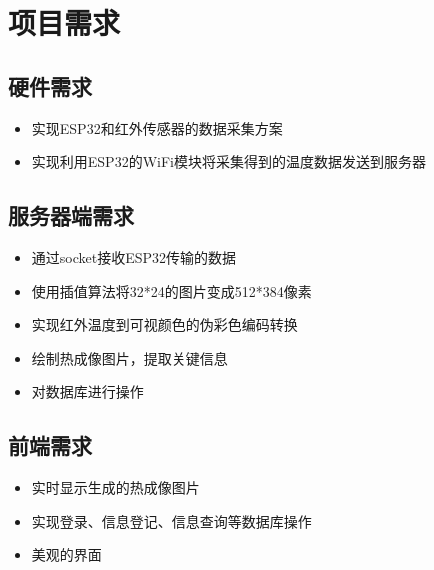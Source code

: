 \chapter{项目需求}
\section{硬件需求}
\begin{itemize}
    \item 实现ESP32和红外传感器的数据采集方案
    \item 实现利用ESP32的WiFi模块将采集得到的温度数据发送到服务器
    \end{itemize}
\section{服务器端需求}
\begin{itemize}
    \item 通过socket接收ESP32传输的数据
    \item 使用插值算法将32*24的图片变成512*384像素
    \item 实现红外温度到可视颜色的伪彩色编码转换
    \item 绘制热成像图片，提取关键信息
    \item 对数据库进行操作
    \end{itemize}
\section{前端需求}
\begin{itemize}
    \item 实时显示生成的热成像图片
    \item 实现登录、信息登记、信息查询等数据库操作
    \item 美观的界面
    \end{itemize}